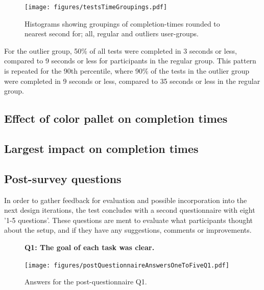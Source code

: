 \documentclass[nofilelist,dvipsnames]{cslthse-msc}
\begin{document}
        \begin{figure}[h!]
          \centering
          \texttt{[image: figures/testsTimeGroupings.pdf]}
          \caption{
            Histograms showing groupings of completion-times rounded to nearest
            second for; all, regular and outliers user-groups.
          }
        \end{figure}

        For the outlier group, 50\% of all tests were completed in 3 seconds or
        less, compared to 9 seconds or less for participants in the regular
        group. This pattern is repeated for the 90th percentile, where 90\% of
        the tests in the outlier group were completed in 9 seconds or less,
        compared to 35 seconds or less in the regular group.

			\subsection{Effect of color pallet on completion times}


			\subsection{Largest impact on completion times}


			\subsection{Post-survey questions}

        In order to gather feedback for evaluation and possible incorporation
        into the next design iterations, the test concludes with a second
        questionnaire with eight '1-5 questions'. These questions are ment to
        evaluate what participants thought about the setup, and if they have
        any suggestions, comments or improvements.

				\begin{figure}[h!]
          \textbf{Q1: The goal of each task was clear.}
          \begin{center}
            \texttt{[image: figures/postQuestionnaireAnswersOneToFiveQ1.pdf]}
            \vspace{-1cm}
            \caption{Answers for the post-questionnaire Q1.}
          \end{center}
				\end{figure}
\end{document}

